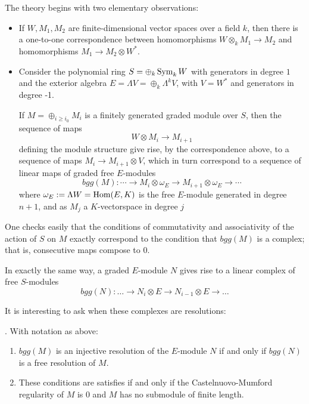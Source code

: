\documentclass[twoside,12pt, leqno]{amsart}
\begin{document}
The theory begins with two elementary observations:
\begin{itemize}
 \item If $W,M_1, M_2$ are finite-dimensional vector spaces over a field $k$, then there is a one-to-one correspondence between homomorphisms $W\otimes_kM_1\to M_2$ and homomorphisms
$ M_1 \to M_2 \otimes W^*$.
\item Consider the polynomial ring $S = \oplus_k \operatorname{Sym}_kW$ with generators in degree $1$ and the exterior algebra $E = \Lambda V= \oplus_k \Lambda^kV$, with $V=W^*$ and generators in degree -1.

If $M = \oplus_{i\geq i_0} M_i$ is a finitely generated graded module over $S$, then the sequence of maps 
$$
W\otimes M_i \to M_{i+1}
$$
 defining the module structure give rise, by the correspondence above,
to a sequence of maps $M_i\to M_{i+1}\otimes V$, which in turn correspond to a sequence of
linear maps of graded free $E$-modules 
$$ 
bgg(M): \cdots \to M_i\otimes \omega_E \to M_{i+1}\otimes \omega_E \to \cdots
$$
where $\omega_E:=\Lambda W=\operatorname{Hom}(E,K)$ is the free $E$-module generated in degree $n+1$, and as $M_j$ a $K$-vectorspace in degree $j$
\end{itemize}

One checks easily that the conditions of commutativity and associativity of the action of $S$ on $M$ exactly correspond to the condition that $bgg(M)$ is a complex; that is, consecutive maps compose to 0.

In exactly the same way, a graded $E$-module $N$ gives rise to a linear  complex of free $S$-modules
$$bgg(N): \ldots \to N_i \otimes E \to N_{i-1} \otimes  E \to \ldots $$


It is interesting to ask when these complexes are resolutions:

\begin{theorem}[Reciprocity] \cite[Theorem x.y] {EFS}. With notation as above:
\begin{enumerate}
 \item $bgg(M)$ is an injective resolution of the $E$-module $N$ if and only if
$bgg(N)$ is a free resolution of $M$.

\item These conditions are satisfies if and only if the Castelnuovo-Mumford regularity of $M$ is 0 and $M$ has no submodule of finite length.
\end{enumerate}
\end{theorem}
\end{document}
